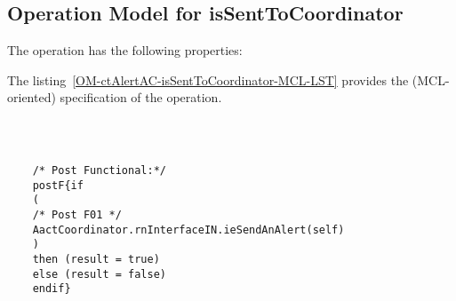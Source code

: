 \subsection{Operation Model for isSentToCoordinator}

\label{OM-isSentToCoordinator}


The  operation has the following properties:

	\begin{operationmodel}



		


	\end{operationmodel}



	\vspace{1cm}
	The listing~\ref{OM-ctAlertAC-isSentToCoordinator-MCL-LST} provides the \msrmessir (MCL-oriented) specification of the operation.
	
	\scriptsize
	\vspace{0.5cm}
	\begin{lstlisting}[style=MessirStyle,firstnumber=auto,captionpos=b,caption={\msrmessir (MCL-oriented) specification of the operation \emph{isSentToCoordinator}.},label=OM-ctAlertAC-isSentToCoordinator-MCL-LST]

	
	
	/* Post Functional:*/ 
	postF{if
	(
	/* Post F01 */
	AactCoordinator.rnInterfaceIN.ieSendAnAlert(self)
	)
	then (result = true)
	else (result = false)
	endif}
	
	
	\end{lstlisting}
	\normalsize 
	
	
	
	





